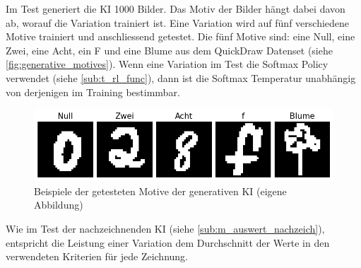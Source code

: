 Im Test generiert die KI 1000 Bilder. Das Motiv der Bilder hängt dabei davon ab,
worauf die Variation trainiert ist. Eine Variation wird auf fünf verschiedene
Motive trainiert und anschliessend getestet. Die fünf Motive sind: eine Null,
eine Zwei, eine Acht, ein F und eine Blume aus dem QuickDraw Datenset (siehe
\autoref{fig:generative_motives}). Wenn eine Variation im Test die Softmax
Policy verwendet (siehe \ref{sub:t_rl_func}), dann ist die Softmax
Temperatur unabhängig von derjenigen im Training bestimmbar.


\begin{figure}[!ht]
    \centering
    \includegraphics[width=\textwidth]{images/methode/generative-examples.png}
    \caption{Beispiele der getesteten Motive der generativen KI (eigene Abbildung)}\label{fig:generative_motives}
\end{figure}



Wie im Test der nachzeichnenden KI (siehe \ref{sub:m_auswert_nachzeich}),
entspricht die Leistung einer Variation dem Durchschnitt der Werte in den
verwendeten Kriterien für jede Zeichnung.